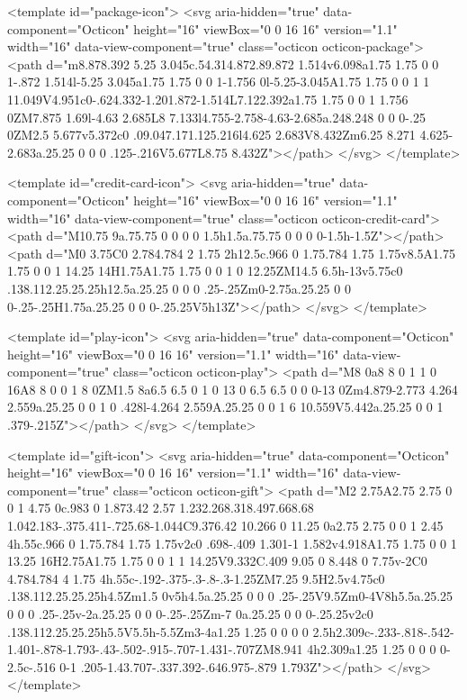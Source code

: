 <template id="package-icon">
  <svg aria-hidden="true" data-component="Octicon" height="16" viewBox="0 0 16 16" version="1.1" width="16" data-view-component="true" class="octicon octicon-package">
    <path d="m8.878.392 5.25 3.045c.54.314.872.89.872 1.514v6.098a1.75 1.75 0 0 1-.872 1.514l-5.25 3.045a1.75 1.75 0 0 1-1.756 0l-5.25-3.045A1.75 1.75 0 0 1 1 11.049V4.951c0-.624.332-1.201.872-1.514L7.122.392a1.75 1.75 0 0 1 1.756 0ZM7.875 1.69l-4.63 2.685L8 7.133l4.755-2.758-4.63-2.685a.248.248 0 0 0-.25 0ZM2.5 5.677v5.372c0 .09.047.171.125.216l4.625 2.683V8.432Zm6.25 8.271 4.625-2.683a.25.25 0 0 0 .125-.216V5.677L8.75 8.432Z"></path>
</svg>
</template>

<template id="credit-card-icon">
  <svg aria-hidden="true" data-component="Octicon" height="16" viewBox="0 0 16 16" version="1.1" width="16" data-view-component="true" class="octicon octicon-credit-card">
    <path d="M10.75 9a.75.75 0 0 0 0 1.5h1.5a.75.75 0 0 0 0-1.5h-1.5Z"></path><path d="M0 3.75C0 2.784.784 2 1.75 2h12.5c.966 0 1.75.784 1.75 1.75v8.5A1.75 1.75 0 0 1 14.25 14H1.75A1.75 1.75 0 0 1 0 12.25ZM14.5 6.5h-13v5.75c0 .138.112.25.25.25h12.5a.25.25 0 0 0 .25-.25Zm0-2.75a.25.25 0 0 0-.25-.25H1.75a.25.25 0 0 0-.25.25V5h13Z"></path>
</svg>
</template>

<template id="play-icon">
  <svg aria-hidden="true" data-component="Octicon" height="16" viewBox="0 0 16 16" version="1.1" width="16" data-view-component="true" class="octicon octicon-play">
    <path d="M8 0a8 8 0 1 1 0 16A8 8 0 0 1 8 0ZM1.5 8a6.5 6.5 0 1 0 13 0 6.5 6.5 0 0 0-13 0Zm4.879-2.773 4.264 2.559a.25.25 0 0 1 0 .428l-4.264 2.559A.25.25 0 0 1 6 10.559V5.442a.25.25 0 0 1 .379-.215Z"></path>
</svg>
</template>

<template id="gift-icon">
  <svg aria-hidden="true" data-component="Octicon" height="16" viewBox="0 0 16 16" version="1.1" width="16" data-view-component="true" class="octicon octicon-gift">
    <path d="M2 2.75A2.75 2.75 0 0 1 4.75 0c.983 0 1.873.42 2.57 1.232.268.318.497.668.68 1.042.183-.375.411-.725.68-1.044C9.376.42 10.266 0 11.25 0a2.75 2.75 0 0 1 2.45 4h.55c.966 0 1.75.784 1.75 1.75v2c0 .698-.409 1.301-1 1.582v4.918A1.75 1.75 0 0 1 13.25 16H2.75A1.75 1.75 0 0 1 1 14.25V9.332C.409 9.05 0 8.448 0 7.75v-2C0 4.784.784 4 1.75 4h.55c-.192-.375-.3-.8-.3-1.25ZM7.25 9.5H2.5v4.75c0 .138.112.25.25.25h4.5Zm1.5 0v5h4.5a.25.25 0 0 0 .25-.25V9.5Zm0-4V8h5.5a.25.25 0 0 0 .25-.25v-2a.25.25 0 0 0-.25-.25Zm-7 0a.25.25 0 0 0-.25.25v2c0 .138.112.25.25.25h5.5V5.5h-5.5Zm3-4a1.25 1.25 0 0 0 0 2.5h2.309c-.233-.818-.542-1.401-.878-1.793-.43-.502-.915-.707-1.431-.707ZM8.941 4h2.309a1.25 1.25 0 0 0 0-2.5c-.516 0-1 .205-1.43.707-.337.392-.646.975-.879 1.793Z"></path>
</svg>
</template>

